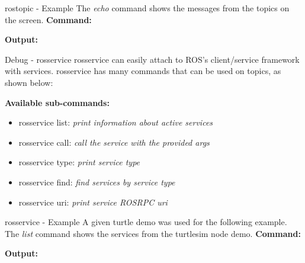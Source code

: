 \documentclass{beamer}
\begin{document}
\begin{frame}{rostopic - Example}
The \textit{echo} command shows the messages from the topics on the screen.
\newline
\textbf{Command:} 

\textbf{Output:}

\end{frame}
\begin{frame}{Debug - rosservice}
rosservice can easily attach to ROS's client/service framework with services. rosservice has many commands that can be used on topics, as shown below:
\newline
\newline
\begin{large}\textbf{Available sub-commands:}\end{large}
\begin{itemize}
	\item rosservice list:   \textit{ print information about active services}
	\item rosservice call:   \textit{call the service with the provided args}
	\item rosservice type:   \textit{print service type}    
	\item rosservice find:   \textit{find services by service type}
	\item rosservice uri:    \textit{ print service ROSRPC uri}
\end{itemize}
\end{frame}
\begin{frame}{rosservice - Example}
A given turtle demo was used for the following example.
\newline
The \textit{list} command shows the services from the turtlesim node demo.
\textbf{Command:} 


\textbf{Output:}

\end{frame}
\end{document}
